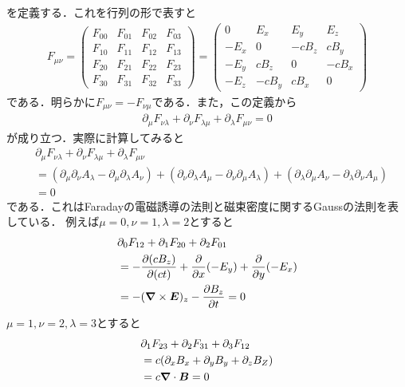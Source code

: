 \documentclass{report}
\begin{document}
  を定義する．これを行列の形で表すと
  \begin{align}
    F_{\mu\nu}=
    \begin{pmatrix}
      F_{00} & F_{01} & F_{02} & F_{03}\\
      F_{10} & F_{11} & F_{12} & F_{13}\\
      F_{20} & F_{21} & F_{22} & F_{23}\\
      F_{30} & F_{31} & F_{32} & F_{33}
    \end{pmatrix}
    =
    \begin{pmatrix}
      0 & E_x & E_y & E_z \\
      -E_x & 0 & -cB_z & cB_y\\
      -E_y & cB_z & 0 & -cB_x\\
      -E_z& -cB_y & cB_x & 0
    \end{pmatrix}
  \end{align}
  である．明らかに$F_{\mu\nu} = -F_{\nu\mu}$である．また，この定義から
  \begin{align}
    \partial_\mu F_{\nu\lambda} + \partial_\nu F_{\lambda\mu} + \partial_\lambda F_{\mu\nu} = 0
  \end{align}
  が成り立つ．実際に計算してみると
  \begin{align}
    &\partial_\mu F_{\nu\lambda} + \partial_\nu F_{\lambda\mu} + \partial_\lambda F_{\mu\nu} \\
    &= (\partial_\mu\partial_\nu A_\lambda - \partial_\mu\partial_\lambda A_\nu) + (\partial_\nu\partial_\lambda A_\mu - \partial_\nu\partial_\mu A_\lambda)
    + (\partial_\lambda\partial_\mu A_\nu - \partial_\lambda\partial_\nu A_\mu)\\
    &= 0
  \end{align}
  である．これはFaradayの電磁誘導の法則と磁束密度に関するGaussの法則を表している．
  例えば$\mu = 0,\nu = 1, \lambda =2$とすると
  \begin{align}
    &\partial_0 F_{12} + \partial_1 F_{20} + \partial_2 F_{01}\\
    &= -\frac{\partial (cB_z)}{\partial (ct)} + \frac{\partial}{\partial x}(-E_y) + \frac{\partial}{\partial y}(-E_x)\\
    &= -(\grad\times \bm{E})_z - \frac{\partial B_z}{\partial t} = 0
  \end{align}
  $\mu=1,\nu=2,\lambda=3$とすると
  \begin{align}
    &\partial_1 F_{23} + \partial_2 F_{31} + \partial_3 F_{12}\\
    &= c(\partial_xB_x + \partial_yB_y + \partial_zB_Z)\\
    &= c\grad\cdot\bm{B} = 0
  \end{align}
\end{document}
